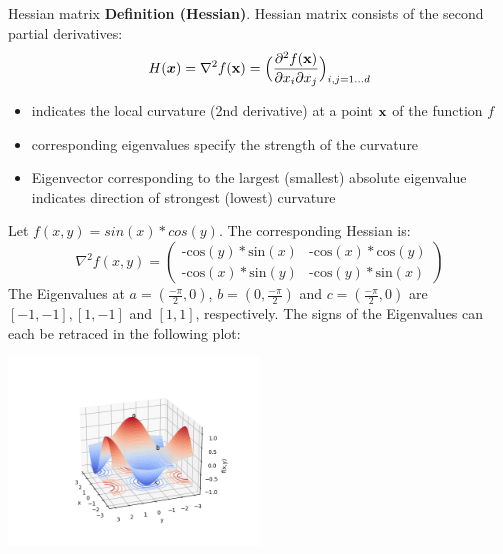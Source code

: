 \begin{vbframe}{Hessian matrix}
  \textbf{Definition (Hessian)}. Hessian matrix consists of the second partial derivatives:
  \[ H(\boldsymbol{x}) =\nabla^2 f(\mathbf{x}) =
  \Bigl(\frac{\partial^2 f(\mathbf{x})}{\partial x_i \partial x_j}\Bigr)_{i,j=1\ldots d}\]
  \begin{itemize}
  \item indicates the local curvature (2nd derivative) at a point $\mathbf{x}$ of the function $f$
  \item corresponding eigenvalues specify the strength of the curvature
  \item Eigenvector corresponding to the largest (smallest) absolute eigenvalue indicates  direction of strongest (lowest) curvature
  \end{itemize}


  \framebreak 

    Let $f(x,y) = sin(x) * cos(y)$.
    The corresponding Hessian is: 
    \vspace*{-0.2cm}
    $$
    \nabla^2 f(x,y) = \begin{pmatrix}
    \text{-cos}(y)*\text{sin}(x) & \text{-cos}(x)*\text{cos}(y) 
    \\ \text{-cos}(x)*\text{sin}(y) & \text{-cos}(y)*\text{sin}(x) 
    \end{pmatrix}
    $$
    \newline
    The Eigenvalues at $a=(\frac{-\pi}{2},0)$, $b=(0,\frac{-\pi}{2})$ and $c=(\frac{-\pi}{2},0)$ are $[-1, -1], [1, -1]$ and $[1, 1]$, respectively.
    The signs of the Eigenvalues can each be retraced in the following plot:
      
      \includegraphics[width = 0.5\textwidth]{figure_man/hessian_3d.png}
  
  \end{vbframe}
  \framebreak 

